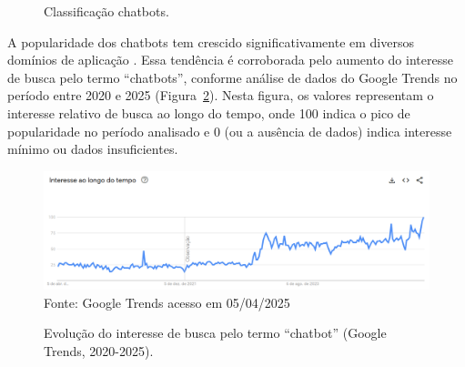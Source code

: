 \documentclass[14pt,a4paper,oneside]{book}
\begin{document}
\begin{figure}
	\centering
	\caption{Classificação chatbots.}
	\label{fig:tipo}
\end{figure}

A popularidade dos chatbots tem crescido significativamente em diversos domínios de aplicação \cite{B2020, Klopfenstein2017, Sharma2020}. Essa tendência é corroborada pelo aumento do interesse de busca pelo termo ``chatbots'', conforme análise de dados do Google Trends no período entre 2020 e 2025 (Figura~\ref{fig:trends}). Nesta figura, os valores representam o interesse relativo de busca ao longo do tempo, onde 100 indica o pico de popularidade no período analisado e 0 (ou a ausência de dados) indica interesse mínimo ou dados insuficientes.

\begin{figure}[!hbp]
	\centering
	\caption{Evolução do interesse de busca pelo termo ``chatbot'' (Google Trends, 2020-2025).}
	\includegraphics[width=1\linewidth]{./fig/trends.png}
	\label{fig:trends}
	{\footnotesize Fonte: Google Trends acesso em 05/04/2025} %
\end{figure}

\end{document}
